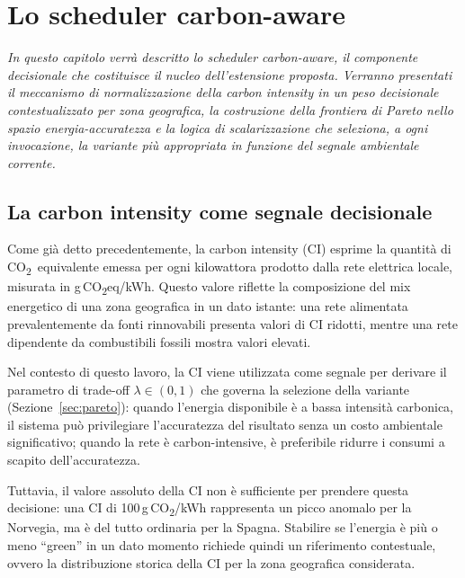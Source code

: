 
\chapter{Lo scheduler carbon-aware}
\label{cap:scheduler}

\emph{In questo capitolo verrà descritto lo scheduler carbon-aware,
il componente decisionale che costituisce il nucleo dell'estensione
proposta. Verranno presentati il meccanismo di normalizzazione della
carbon intensity in un peso decisionale contestualizzato per zona
geografica, la costruzione della frontiera di Pareto nello spazio
energia-accuratezza e la logica di scalarizzazione che seleziona,
a ogni invocazione, la variante più appropriata in funzione del
segnale ambientale corrente.}

\section{La carbon intensity come segnale decisionale}
\label{sec:crf}

Come già detto precedentemente, la carbon intensity (CI) esprime la quantità di
CO\textsubscript{2}~equivalente emessa per ogni kilowattora prodotto
dalla rete elettrica locale, misurata in
g\,CO\textsubscript{2}eq/kWh. Questo valore riflette la composizione
del mix energetico di una zona geografica in un dato istante: una rete
alimentata prevalentemente da fonti rinnovabili presenta valori di CI
ridotti, mentre una rete dipendente da combustibili fossili mostra
valori elevati.

Nel contesto di questo lavoro, la CI viene utilizzata come segnale
per derivare il parametro di trade-off $\lambda \in (0,1)$ che governa
la selezione della variante (Sezione~\ref{sec:pareto}): quando
l'energia disponibile è a bassa intensità carbonica, il sistema può
privilegiare l'accuratezza del risultato senza un costo ambientale
significativo; quando la rete è carbon-intensive, è preferibile
ridurre i consumi a scapito dell'accuratezza.

Tuttavia, il valore assoluto della CI non è sufficiente per prendere
questa decisione: una CI di 100\,g\,CO\textsubscript{2}/kWh
rappresenta un picco anomalo per la Norvegia, ma è del tutto ordinaria
per la Spagna. Stabilire se l'energia è più o meno ``green'' in un
dato momento richiede quindi un riferimento contestuale, ovvero la
distribuzione storica della CI per la zona geografica considerata.


